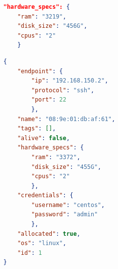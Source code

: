 \begin{lstlisting}[language=json,firstnumber=1, caption={An example of additional data inserted by the Specification Retriever}, captionpos=b, label=lst:JSONSpecs]
"hardware_specs": {
	"ram": "3219", 
	"disk_size": "456G", 
	"cpus": "2"
	}
\end{lstlisting}

\begin{lstlisting}[language=json, firstnumber=1, caption={An example of final data structure after the Specification Retriever has inserted hardware data}, captionpos=b, label=lst:FinalJSON]
{
	"endpoint": {
		"ip": "192.168.150.2", 
		"protocol": "ssh", 
		"port": 22
		},
	"name": "08:9e:01:db:af:61", 
	"tags": [], 
	"alive": false, 
	"hardware_specs": {
		"ram": "3372", 
		"disk_size": "455G", 
		"cpus": "2"
		}, 
	"credentials": {
		"username": "centos", 
		"password": "admin"
		}, 
	"allocated": true, 
	"os": "linux", 
	"id": 1
}

\end{lstlisting}